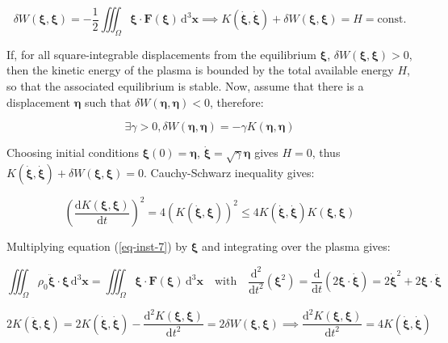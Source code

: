 \begin{equation}
    \delta W(\boldsymbol{\xi},\boldsymbol{\xi})=-\frac{1}{2}\iiint_\Omega\boldsymbol{\xi}\cdot\mathbf{F}(\boldsymbol{\xi})\,\mathrm{d}^3\mathbf{x}\implies K(\dot{\boldsymbol{\xi}},\dot{\boldsymbol{\xi}})+\delta W(\boldsymbol{\xi},\boldsymbol{\xi})=H=\text{const.}
\end{equation}

If, for all square-integrable displacements from the equilibrium $\boldsymbol{\xi}$, $\delta W(\boldsymbol{\xi},\boldsymbol{\xi})>0$, then the kinetic energy of the plasma is bounded by the total available energy $H$, so that the associated equilibrium is stable. Now, assume that there is a displacement $\boldsymbol{\eta}$ such that $\delta W(\boldsymbol{\eta},\boldsymbol{\eta})<0$, therefore:

\begin{equation}
     \label{eq-inst-22}
    \exists\gamma>0,\delta W(\boldsymbol{\eta},\boldsymbol{\eta})=-\gamma K(\boldsymbol{\eta},\boldsymbol{\eta})
\end{equation}

Choosing initial conditions $\boldsymbol{\xi}(0)=\boldsymbol{\eta}$, $\dot{\boldsymbol{\xi}}=\sqrt{\gamma}\boldsymbol{\eta}$ gives $H=0$, thus $K(\dot{\boldsymbol{\xi}},\dot{\boldsymbol{\xi}})+\delta W(\boldsymbol{\xi},\boldsymbol{\xi})=0$. Cauchy-Schwarz inequality gives:

\begin{equation}
    \left(\frac{\mathrm{d}K(\boldsymbol{\xi},\boldsymbol{\xi})}{\mathrm{d}t}\right)^2=4\left(K(\dot{\boldsymbol{\xi}},\boldsymbol{\xi})\right)^2\leq4K(\dot{\boldsymbol{\xi}},\dot{\boldsymbol{\xi}})K(\boldsymbol{\xi},\boldsymbol{\xi})
\end{equation}

Multiplying equation (\ref{eq-inst-7}) by $\boldsymbol{\xi}$ and integrating over the plasma gives:

\begin{equation}
    \iiint_\Omega\rho_0\ddot{\boldsymbol{\xi}}\cdot\boldsymbol{\xi}\,\mathrm{d}^3\mathbf{x}=\iiint_\Omega\boldsymbol{\xi}\cdot\mathbf{F}(\boldsymbol{\xi})\,\mathrm{d}^3\mathbf{x}\quad\text{with}\quad\frac{\mathrm{d}^2}{\mathrm{d}t^2}\left(\boldsymbol{\xi}^2\right)=\frac{\mathrm{d}}{\mathrm{d}t}(2\boldsymbol{\xi}\cdot\dot{\boldsymbol{\xi}})=2\dot{\boldsymbol{\xi}}^2+2\boldsymbol{\xi}\cdot\ddot{\boldsymbol{\xi}}
\end{equation}

\begin{equation}
    2K(\ddot{\boldsymbol{\xi}},\boldsymbol{\xi})=2K(\dot{\boldsymbol{\xi}},\dot{\boldsymbol{\xi}})-\frac{\mathrm{d}^2K(\boldsymbol{\xi},\boldsymbol{\xi})}{\mathrm{d}t^2}=2\delta W(\boldsymbol{\xi},\boldsymbol{\xi})\implies\frac{\mathrm{d}^2K(\boldsymbol{\xi},\boldsymbol{\xi})}{\mathrm{d}t^2}=4K(\dot{\boldsymbol{\xi}},\dot{\boldsymbol{\xi}})
\end{equation}

